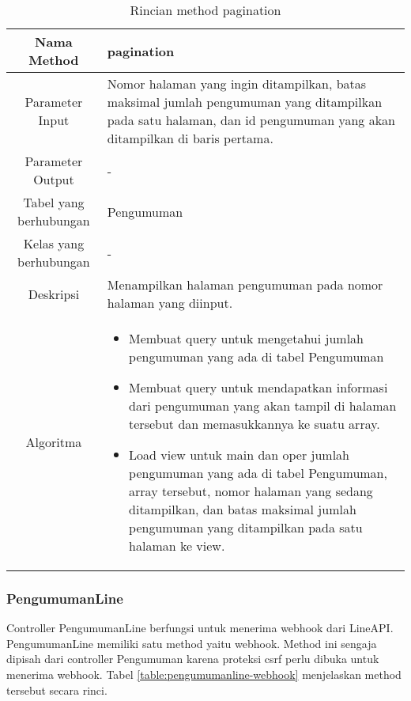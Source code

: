 \begin{center}
	\begin{table}[H]
	\caption{Rincian method pagination}
	\label{table:pengumuman-pagination}
\begin{tabular}{|c|p{11cm}|}
\hline
Nama Method 	& 	 pagination	\\
\hline
Parameter Input &  Nomor halaman yang ingin ditampilkan, batas maksimal jumlah pengumuman yang ditampilkan pada satu halaman, dan id pengumuman yang akan ditampilkan di baris pertama.\\
\hline
Parameter Output & - \\
\hline
Tabel yang berhubungan & Pengumuman \\
\hline
Kelas yang berhubungan & - \\
\hline
Deskripsi	& Menampilkan halaman pengumuman pada nomor halaman yang diinput.\\
\hline
Algoritma	& \begin{itemize}
				\item Membuat query untuk mengetahui jumlah pengumuman yang ada di tabel Pengumuman				
				\item Membuat query untuk mendapatkan informasi dari pengumuman yang akan tampil di halaman tersebut dan memasukkannya ke suatu array.
				\item Load view untuk main dan oper jumlah pengumuman yang ada di tabel Pengumuman, array tersebut, nomor halaman yang sedang ditampilkan, dan batas maksimal jumlah pengumuman yang ditampilkan pada satu halaman ke view.
				\end{itemize} \\
\hline
\end{tabular}
\end{table}
\end{center}

\subsubsection{PengumumanLine}
Controller PengumumanLine berfungsi untuk menerima webhook dari LineAPI. PengumumanLine memiliki satu method yaitu webhook. Method ini sengaja dipisah dari controller Pengumuman karena proteksi csrf perlu dibuka untuk menerima webhook. Tabel \ref{table:pengumumanline-webhook} menjelaskan method tersebut secara rinci.


